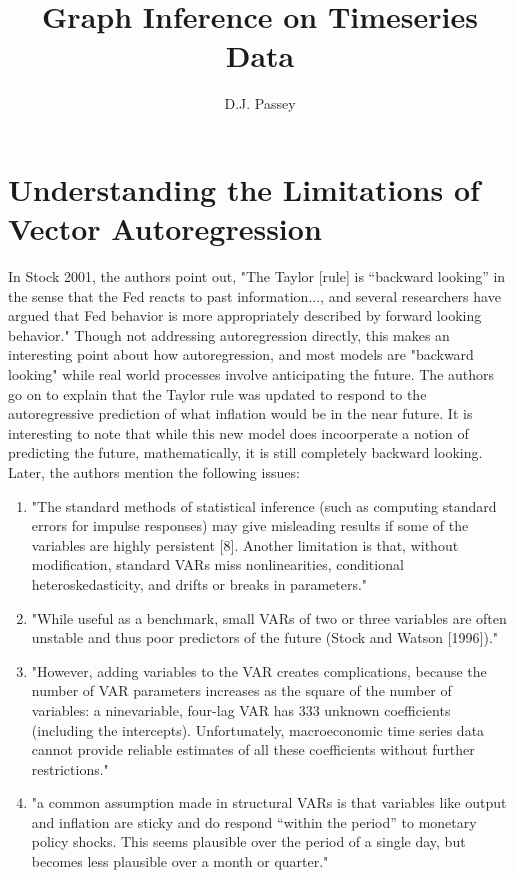 \documentclass{article}
\title{Graph Inference on Timeseries Data}
\author{D.J. Passey}
\begin{document}
\maketitle

\section{Understanding the Limitations of Vector Autoregression}

    In Stock 2001, the authors point out, "The Taylor [rule] is “backward 
    looking” in the sense that the Fed reacts to past information..., 
    and several researchers have argued that Fed behavior is more
    appropriately described by forward looking behavior."
    Though not addressing autoregression directly, this makes an
    interesting point about how autoregression, and most models are
    "backward looking" while real world processes involve
    anticipating the future.
    The authors go on to explain that the Taylor rule was updated
    to respond to the autoregressive prediction of what inflation
    would be in the near future. It is interesting to note that
    while this new model does incoorperate a notion of predicting
    the future, mathematically, it is still completely backward looking.
    Later, the authors mention the following issues: 
    \begin{enumerate}
        \item "The
        standard methods of statistical inference (such as computing 
        standard errors for impulse responses) may give misleading 
        results if some of the variables are highly persistent [8].
        Another limitation is that, without modification, standard 
        VARs miss nonlinearities, conditional heteroskedasticity, and
        drifts or breaks in parameters."
        \item "While useful as a benchmark, small
        VARs of two or three variables are often unstable and thus poor predictors of the future
        (Stock and Watson [1996])."
        \item "However, adding variables to the VAR creates complications, because the
        number of VAR parameters increases as the square of the number of variables: a ninevariable,
        four-lag VAR has 333 unknown coefficients (including the intercepts).
        Unfortunately, macroeconomic time series data cannot provide reliable estimates of all
        these coefficients without further restrictions."
        \item "a common assumption made in
        structural VARs is that variables like output and inflation
        are sticky and do respond “within the period” to monetary 
        policy shocks. This seems plausible over the period of a 
        single day, but becomes less plausible over a month or
        quarter."
    \end{enumerate}
\end{document}
